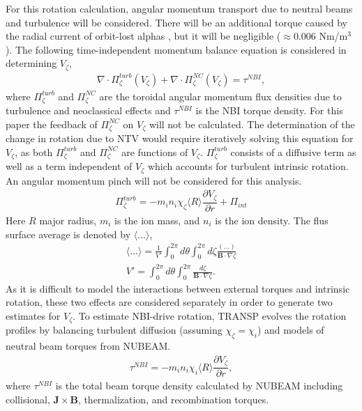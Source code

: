 \documentclass{article}
\numberwithin{figure}{section}
\numberwithin{equation}{section}
\newcommand{\partder}[2]{\dfrac{\partial  #1}{\partial  #2}} %
\begin{document}
For this rotation calculation, angular momentum transport due to neutral beams and turbulence will be considered. There will be an additional torque caused by the radial current of orbit-lost alphas \cite{Rosenbluth1996}, but it will be negligible ($\approx 0.006$ Nm/m$^3$). The following time-independent momentum balance equation is considered in determining $V_{\zeta}$,
\begin{gather}
\nabla \cdot \Pi_{\zeta}^{turb}(V_{\zeta}) + \nabla \cdot \Pi_{\zeta}^{NC}(V_{\zeta}) = \tau^{NBI},
\end{gather}
where $\Pi^{turb}_{\zeta}$ and $\Pi^{NC}_{\zeta}$ are the toroidal angular momentum flux densities due to turbulence and neoclassical effects and $\tau^{NBI}$ is the NBI torque density. For this paper the feedback of $\Pi_{\zeta}^{NC}$ on $V_{\zeta}$ will not be calculated. The determination of the change in rotation due to NTV would require iteratively solving this equation for $V_{\zeta}$, as both $\Pi_{\zeta}^{turb}$ and $\Pi_{\zeta}^{NC}$ are functions of $V_{\zeta}$. $\Pi_{\zeta}^{turb}$ consists of a diffusive term as well as a term independent of $V_{\zeta}$ which accounts for turbulent intrinsic rotation. An angular momentum pinch will not be considered for this analysis. 
\begin{gather}
\Pi_{\zeta}^{turb} = -m_i n_i \chi_{\zeta} \langle R \rangle\partder{V_{\zeta}}{r} + \Pi_{int}
\end{gather}
Here $R$ major radius, $m_i$ is the ion mass, and $n_i$ is the ion density. The flus surface average is denoted by $\langle ... \rangle$,
\begin{gather}
\langle ... \rangle = \frac{1}{V'} \int_0^{2 \pi} d \theta \int_0^{2 \pi} d \zeta \frac{ (...)}{\bm{B} \cdot \nabla \zeta}
\\ V' = \int_0^{2\pi} d \theta \int_0^{2 \pi} \frac{d \zeta}{\bm{B} \cdot \nabla \zeta}.
\end{gather}
As it is difficult to model the interactions between external torques and intrinsic rotation, these two effects are considered separately in order to generate two estimates for $V_{\zeta}$. To estimate NBI-drive rotation, TRANSP evolves the rotation profiles by balancing turbulent diffusion (assuming $\chi_{\zeta} = \chi_{i}$) and models of neutral beam torques from NUBEAM. 
\begin{gather}
\tau^{NBI} = -m_i n_i \chi_{i} \langle R \rangle \partder{V_{\zeta}}{r},
\end{gather}
where $\tau^{NBI}$ is the total beam torque density calculated by NUBEAM including collisional, $\bm{J} \times \bm{B}$, thermalization, and recombination torques.
\end{document}
